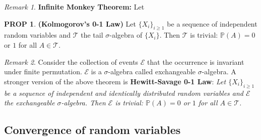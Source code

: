 \documentclass[hidelinks,11pt]{article}
\theoremstyle{definition}
\theoremstyle{dotless}
\newtheorem{prop}{PROP}[section]
\theoremstyle{remark}
\newtheorem*{remark}{Remark}
\DeclareMathOperator{\1}{\mathbf{1}}
\begin{document}
\begin{remark}\textup{\textbf{Infinite Monkey Theorem:}} Let
\end{remark}

\begin{prop}\textup{\textbf{(Kolmogorov's 0-1 Law)}} Let $\{X_i\}_{i\geq1}$ be a sequence of independent random variables and $\mathcal{T}$ the tail $\sigma$-algebra of $\{X_i\}$. Then $\mathcal{T}$ is trivial: $\mathbb{P}(A)=0$ or $1$ for all $A\in\mathcal{T}$.
\end{prop}

\begin{remark}
Consider the collection of events $\mathcal{E}$ that the occurrence is invariant under finite permutation. $\mathcal{E}$ is a $\sigma$-algebra called exchangeable $\sigma$-algebra. A stronger version of the above theorem is \textbf{Hewitt-Savage 0-1 Law}:\smallbreak
\textit{Let $\{X_i\}_{i\geq1}$ be a sequence of independent and identically distributed random variables and $\mathcal{E}$ the exchangeable $\sigma$-algebra. Then $\mathcal{E}$ is trivial: $\mathbb{P}(A)=0$ or $1$ for all $A\in\mathcal{T}$.}
\end{remark}

\subsection{Convergence of random variables}
\end{document}
